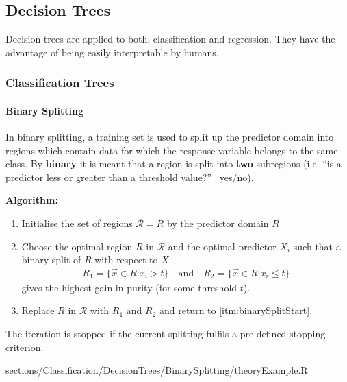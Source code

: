 \subsection{Decision Trees}

	Decision trees are applied to both, classification and regression. They have the advantage of being easily interpretable by humans.
	
	\subsubsection{Classification Trees}	
		\paragraph{Binary Splitting}
			In binary splitting, a training set is used to split up the predictor domain into regions which contain data for which the response variable belongs to the same class. By \textbf{binary} it is meant that a region is split into \textbf{two} subregions (i.e. ``is a predictor less or greater than a threshold value?'' \textrightarrow\ yes/no).
			
			\RTheory
			{
				\textbf{Algorithm:}
				\begin{enumerate}
				  	\item Initialise the set of regions $\mathcal{R} = {R}$ by the predictor domain $R$
				  	\item\label{itm:binarySplitStart}  Choose the optimal region $R$ in $\mathcal{R}$ and the optimal predictor $X_i$ such that a binary split of $R$ with respect to $X$
						$$R_1 = \{\vec{x} \in R | x_i > t\} \quad\mathrm{and}\quad R_2 = \{\vec{x} \in R | x_i \leq t\}$$
						gives the highest gain in purity (for some threshold $t$).
					\item Replace $R$ in $\mathcal{R}$ with $R_1$ and $R_2$ and return to \ref{itm:binarySplitStart}.
				\end{enumerate}
				
				The iteration is stopped if the current splitting fulfils a pre-defined stopping criterion.
				
			}
			{
				sections/Classification/DecisionTrees/BinarySplitting/theoryExample.R
			}
			
